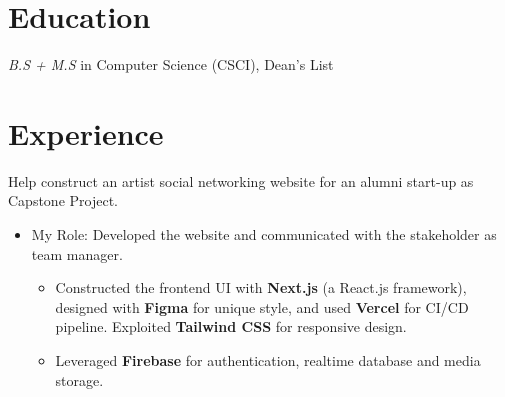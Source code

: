 \documentclass{resume}
\begin{document}



\section{Education}
\textit{B.S + M.S} in Computer Science (CSCI), Dean's List

\section{Experience}

  Help construct an artist social networking website for an alumni start-up as Capstone Project.
  \begin{itemize}
  \item My Role: Developed the website and communicated with the stakeholder as team manager.
  \begin{itemize}
    \item Constructed the frontend UI with \textbf{Next.js} (a React.js framework), designed with \textbf{Figma} for unique style, and used \textbf{Vercel} for CI/CD pipeline. Exploited \textbf{Tailwind CSS} for responsive design.
    \item Leveraged \textbf{Firebase} for authentication, realtime database and media storage.
  \end{itemize}
  \end{itemize}
\end{document}
